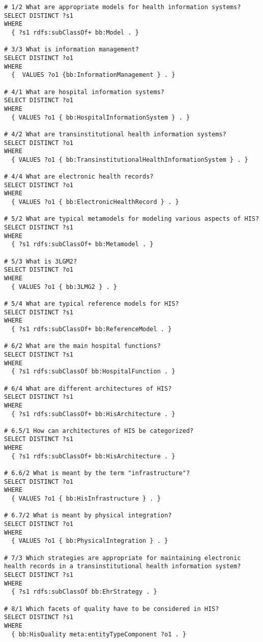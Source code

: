 \begin{lstlisting}[language=SPARQL]
# 1/2 What are appropriate models for health information systems?
SELECT DISTINCT ?s1
WHERE
  { ?s1 rdfs:subClassOf+ bb:Model . }

# 3/3 What is information management?
SELECT DISTINCT ?o1
WHERE
  {  VALUES ?o1 {bb:InformationManagement } . }

# 4/1 What are hospital information systems?
SELECT DISTINCT ?o1
WHERE
  { VALUES ?o1 { bb:HospitalInformationSystem } . }

# 4/2 What are transinstitutional health information systems?
SELECT DISTINCT ?o1
WHERE
  { VALUES ?o1 { bb:TransinstitutionalHealthInformationSystem } . }

# 4/4 What are electronic health records?
SELECT DISTINCT ?o1
WHERE
  { VALUES ?o1 { bb:ElectronicHealthRecord } . }

# 5/2 What are typical metamodels for modeling various aspects of HIS?
SELECT DISTINCT ?s1
WHERE
  { ?s1 rdfs:subClassOf+ bb:Metamodel . }

# 5/3 What is 3LGM2?
SELECT DISTINCT ?o1
WHERE
  { VALUES ?o1 { bb:3LMG2 } . }

# 5/4 What are typical reference models for HIS?
SELECT DISTINCT ?s1
WHERE
  { ?s1 rdfs:subClassOf+ bb:ReferenceModel . }

# 6/2 What are the main hospital functions?
SELECT DISTINCT ?s1
WHERE
  { ?s1 rdfs:subClassOf bb:HospitalFunction . }

# 6/4 What are different architectures of HIS?
SELECT DISTINCT ?s1
WHERE
  { ?s1 rdfs:subClassOf+ bb:HisArchitecture . }

# 6.5/1 How can architectures of HIS be categorized?
SELECT DISTINCT ?s1
WHERE
  { ?s1 rdfs:subClassOf+ bb:HisArchitecture . }

# 6.6/2 What is meant by the term "infrastructure"?
SELECT DISTINCT ?o1
WHERE
  { VALUES ?o1 { bb:HisInfrastructure } . }

# 6.7/2 What is meant by physical integration?
SELECT DISTINCT ?o1
WHERE
  { VALUES ?o1 { bb:PhysicalIntegration } . }

# 7/3 Which strategies are appropriate for maintaining electronic health records in a transinstitutional health information system?
SELECT DISTINCT ?s1
WHERE
  { ?s1 rdfs:subClassOf bb:EhrStrategy . }

# 8/1 Which facets of quality have to be considered in HIS?
SELECT DISTINCT ?s1
WHERE
  { bb:HisQuality meta:entityTypeComponent ?o1 . }


\end{lstlisting}

